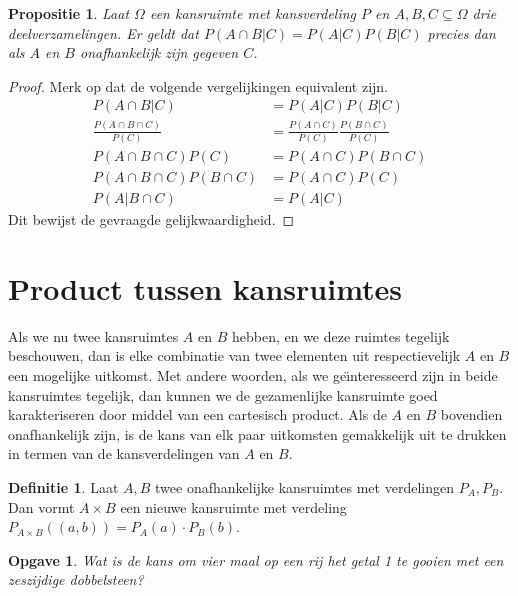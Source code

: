 \documentclass[a4paper]{book}
\newtheorem{proposition}[theorem]{Propositie}
\newtheorem{exercise}[theorem]{Opgave}
\theoremstyle{definition}
\newtheorem{definition}[theorem]{Definitie}
\begin{document}
\begin{proposition}
    Laat $\Omega$ een kansruimte met kansverdeling $P$ en $A,B,C \subseteq \Omega$ drie deelverzamelingen.
    Er geldt dat $P(A \cap B|C) = P(A|C)P(B|C)$ precies dan als $A$ en $B$ onafhankelijk zijn gegeven $C$.
\end{proposition}
\begin{proof}
    Merk op dat de volgende vergelijkingen equivalent zijn.
    \begin{align*}
        P(A \cap B|C)                       &= P(A|C)P(B|C) \\
        \frac{P(A \cap B \cap C)}{P(C)}     &= \frac{P(A \cap C)}{P(C)} \frac{P(B \cap C)}{P(C)} \\
        P(A \cap B \cap C)P(C)              &= P(A \cap C)P(B \cap C) \\
        P(A \cap B \cap C)P(B \cap C)       &= P(A \cap C)P(C) \\
        P(A | B \cap C)                     &= P(A | C)
    \end{align*}
    Dit bewijst de gevraagde gelijkwaardigheid.
\end{proof}


\section{Product tussen kansruimtes}
Als we nu twee kansruimtes $A$ en $B$ hebben, en we deze ruimtes tegelijk beschouwen, dan is elke
combinatie van twee elementen uit respectievelijk $A$ en $B$ een mogelijke uitkomst.
Met andere woorden, als we ge\"{\i}nteresseerd zijn in beide kansruimtes tegelijk, dan kunnen we de gezamenlijke kansruimte goed karakteriseren
door middel van een cartesisch product.
Als de $A$ en $B$ bovendien onafhankelijk zijn, is de kans van elk paar uitkomsten gemakkelijk uit te drukken in termen van de kansverdelingen van $A$
en $B$.

\begin{definition}
    Laat $A,B$ twee onafhankelijke kansruimtes met verdelingen $P_A,P_B$.
    Dan vormt $A \times B$ een nieuwe kansruimte met verdeling $P_{A \times B}((a,b)) = P_A(a) \cdot P_B(b)$.
\end{definition}

\begin{exercise}
Wat is de kans om vier maal op een rij het getal 1 te gooien met een zeszijdige dobbelsteen?
\end{exercise}
\end{document}
